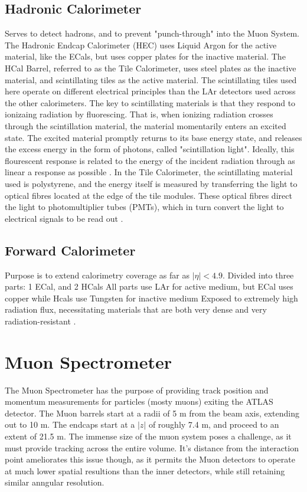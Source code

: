     \subsection{Hadronic Calorimeter}
        Serves to detect hadrons, and to prevent "punch-through" into the Muon System.
        The Hadronic Endcap Calorimeter (HEC) uses Liquid Argon for the active material, like the ECals, but uses copper plates for the inactive material.
        The HCal Barrel, referred to as the Tile Calorimeter, uses steel plates as the inactive material, and scintillating tiles as the active material.
        The scintillating tiles used here operate on different electrical principles than the LAr detectors used across the other calorimeters.
        The key to scintillating materials is that they respond to ionizaing radiation by fluorescing.
        That is, when ionizing radiation crosses through the scintillation material, the material momentarily enters an excited state.
        The excited material promptly returns to its base energy state, and releases the excess energy in the form of photons, called "scintillation light".
        Ideally, this flourescent response is related to the energy of the incident radiation through as linear a response as possible \cite{wiley_radiation_detection}.
        In the Tile Calorimeter, the scintillating material used is polystyrene, and the energy itself is measured by transferring the light to optical fibres located at the edge of the tile modules.
        These optical fibres direct the light to photomultiplier tubes (PMTs), which in turn convert the light to electrical signals to be read out \cite{tcal_tdr}.


    \subsection{Forward Calorimeter}
        Purpose is to extend calorimetry coverage as far as $|\eta| < 4.9$.
        Divided into three parts: 1 ECal, and 2 HCals
        All parts use LAr for active medium, but ECal uses copper while Hcals use Tungsten for inactive medium
        Exposed to extremely high radiation flux, necessitating materials that are both very dense and very radiation-resistant \cite{Lar_cal_tdr}.



\section{Muon Spectrometer}  %
    The Muon Spectrometer has the purpose of providing track position and momentum measurements for particles (mosty muons) exiting the ATLAS detector.
    The Muon barrels start at a radii of 5 m from the beam axis, extending out to 10 m.
    The endcaps start at a $|z|$ of roughly 7.4 m, and proceed to an extent of 21.5 m.
    The immense size of the muon system poses a challenge, as it must provide tracking across the entire volume.
    It's distance from the interaction point ameliorates this issue though, as it permits the Muon detectors to operate at much lower spatial resultions than the inner detectors, while still retaining similar anngular resolution.

